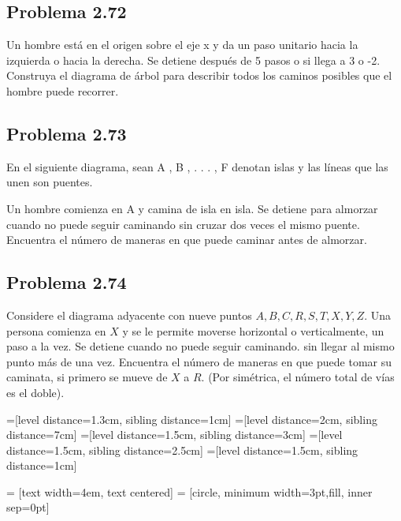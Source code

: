 \documentclass[12pt]{article}
\begin{document}
\subsection*{Problema 2.72}
Un hombre está en el origen sobre el eje x y da un paso unitario hacia la
izquierda o hacia la derecha. Se detiene después de 5 pasos o si llega a 3 o -2.
Construya el diagrama de árbol para describir todos los caminos posibles que el
hombre puede recorrer.

\subsection*{Problema 2.73}
En el siguiente diagrama, sean A , B , . . . , F denotan islas y las líneas que
las unen son puentes.

Un hombre comienza en A y camina de isla en isla. Se detiene para almorzar
cuando no puede seguir caminando sin cruzar dos veces el mismo puente. Encuentra
el número de maneras en que puede caminar antes de almorzar.

\subsection*{Problema 2.74}

Considere el diagrama adyacente con nueve puntos $A, B, C, R, S, T, X, Y, Z$.
Una persona comienza en $X$ y se le permite moverse horizontal o verticalmente,
un paso a la vez. Se detiene cuando no puede seguir caminando. sin llegar al
mismo punto más de una vez. Encuentra el número de maneras en que puede tomar su
caminata, si primero se mueve de $X$ a $R$. (Por simétrica, el número total de
vías es el doble).


=[level distance=1.3cm, sibling distance=1cm]
=[level distance=2cm, sibling distance=7cm]
=[level distance=1.5cm, sibling distance=3cm]
=[level distance=1.5cm, sibling distance=2.5cm]
=[level distance=1.5cm, sibling distance=1cm]

 = [text width=4em, text centered]
 = [circle, minimum width=3pt,fill, inner sep=0pt]
\end{document}
